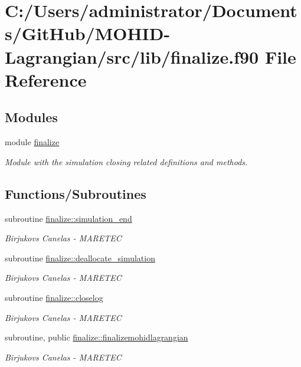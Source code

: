 \hypertarget{finalize_8f90}{}\section{C\+:/\+Users/administrator/\+Documents/\+Git\+Hub/\+M\+O\+H\+I\+D-\/\+Lagrangian/src/lib/finalize.f90 File Reference}
\label{finalize_8f90}
\subsection*{Modules}
\begin{DoxyCompactItemize}
\item 
module \hyperlink{namespacefinalize}{finalize}
\begin{DoxyCompactList}\small\item\em Module with the simulation closing related definitions and methods. \end{DoxyCompactList}\end{DoxyCompactItemize}
\subsection*{Functions/\+Subroutines}
\begin{DoxyCompactItemize}
\item 
subroutine \hyperlink{namespacefinalize_a57fbc96712f416103b529ff969479250}{finalize\+::simulation\+\_\+end}
\begin{DoxyCompactList}\small\item\em Birjukovs Canelas -\/ M\+A\+R\+E\+T\+EC \end{DoxyCompactList}\item 
subroutine \hyperlink{namespacefinalize_a2b6733e6db5a768ac96ad9274685ad43}{finalize\+::deallocate\+\_\+simulation}
\begin{DoxyCompactList}\small\item\em Birjukovs Canelas -\/ M\+A\+R\+E\+T\+EC \end{DoxyCompactList}\item 
subroutine \hyperlink{namespacefinalize_ac448631d05fe5daa8739f32c95e89152}{finalize\+::closelog}
\begin{DoxyCompactList}\small\item\em Birjukovs Canelas -\/ M\+A\+R\+E\+T\+EC \end{DoxyCompactList}\item 
subroutine, public \hyperlink{namespacefinalize_a57aceaa0eb3b16c1942dd2cb013010e4}{finalize\+::finalizemohidlagrangian}
\begin{DoxyCompactList}\small\item\em Birjukovs Canelas -\/ M\+A\+R\+E\+T\+EC \end{DoxyCompactList}\end{DoxyCompactItemize}
